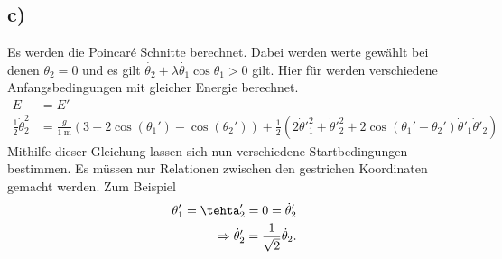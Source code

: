 \subsection*{c)}
Es werden die Poincaré Schnitte berechnet.
Dabei werden werte gewählt bei denen $\theta_2=0$ und es gilt $\dot{\theta_2}+\lambda\dot{\theta_1}\cos\theta_1>0$ gilt.
Hier für werden verschiedene Anfangsbedingungen mit gleicher Energie berechnet.
\begin{align}
	E&=E'\\
	\frac{1}{2}\dot{\theta}_2^2&=\frac{g}{\SI{1}{\meter}}(3-2\cos(\theta_1')-\cos(\theta_2')) + \frac{1}{2}\left( 2\dot{\theta}'_1^2 +\dot{\theta}'_2^2 + 2\cos(\theta_1'-\theta_2')\dot{\theta}'_1\dot{\theta}'_2 \right)
\end{align}
Mithilfe dieser Gleichung lassen sich nun verschiedene Startbedingungen bestimmen.
Es müssen nur Relationen zwischen den gestrichen Koordinaten gemacht werden.
Zum Beispiel
\begin{align}
	\theta_1'=\tehta_2' =0=\dot{\theta}_2'\\
	\Rightarrow \dot{\theta}_2'=\frac{1}{\sqrt{2}}\dot{\theta}_2.
\end{align}